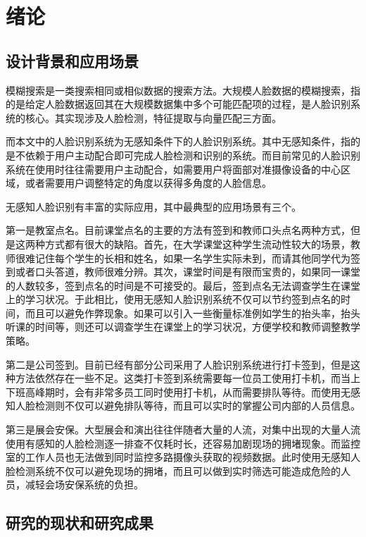 \chapter{绪论}

\section{设计背景和应用场景}

模糊搜索是一类搜索相同或相似数据的搜索方法。大规模人脸数据的模糊搜索，指的是给定人脸数据返回其在大规模数据集中多个可能匹配项的过程，是人脸识别系统的核心。其实现涉及人脸检测，特征提取与向量匹配三方面。

而本文中的人脸识别系统为无感知条件下的人脸识别系统。其中无感知条件，指的是不依赖于用户主动配合即可完成人脸检测和识别的系统。而目前常见的人脸识别系统在使用时往往需要用户主动配合，如需要用户将面部对准摄像设备的中心区域，或者需要用户调整特定的角度以获得多角度的人脸信息。

无感知人脸识别有丰富的实际应用，其中最典型的应用场景有三个。

第一是教室点名。目前课堂点名的主要的方法有签到和教师口头点名两种方式，但是这两种方式都有很大的缺陷。首先，在大学课堂这种学生流动性较大的场景，教师很难记住每个学生的长相和姓名，如果一名学生实际未到，而请其他同学代为签到或者口头答道，教师很难分辨。其次，课堂时间是有限而宝贵的，如果同一课堂的人数较多，签到点名的时间是不可接受的。最后，签到点名无法调查学生在课堂上的学习状况。于此相比，使用无感知人脸识别系统不仅可以节约签到点名的时间，而且可以避免作弊现象。如果可以引入一些衡量标准例如学生的抬头率，抬头听课的时间等，则还可以调查学生在课堂上的学习状况，方便学校和教师调整教学策略。

第二是公司签到。目前已经有部分公司采用了人脸识别系统进行打卡签到，但是这种方法依然存在一些不足。这类打卡签到系统需要每一位员工使用打卡机，而当上下班高峰期时，会有非常多员工同时使用打卡机，从而需要排队等待。而使用无感知人脸检测则不仅可以避免排队等待，而且可以实时的掌握公司内部的人员信息。

第三是展会安保。大型展会和演出往往伴随者大量的人流，对集中出现的大量人流使用有感知的人脸检测逐一排查不仅耗时长，还容易加剧现场的拥堵现象。而监控室的工作人员也无法做到同时监控多路摄像头获取的视频数据。此时使用无感知人脸检测系统不仅可以避免现场的拥堵，而且可以做到实时筛选可能造成危险的人员，减轻会场安保系统的负担。

\section{研究的现状和研究成果}

